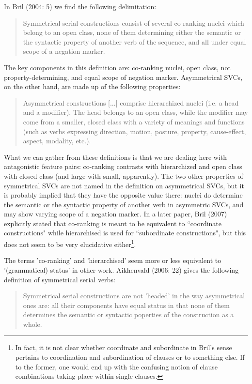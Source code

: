 In Bril (2004: 5) we find the following delimitation: \begin{quote}Symmetrical serial constructions consist of several co-ranking nuclei which belong to an open class, none of them determining either the semantic or the syntactic property of another verb of the sequence, and all under equal scope of a negation marker.\end{quote}

The key components in this definition are: co-ranking nuclei, open class, not property-determining, and equal scope of negation marker. Asymmetrical SVCs, on the other hand, are made up of the following properties: \begin{quote}Asymmetrical constructions [...] comprise hierarchized nuclei (i.e. a head and a modifier). The head belongs to an open class, while the modifier may come from a smaller, closed class with a variety of meanings and functions (such as verbs expressing direction, motion, posture, property, cause-effect, aspect, modality, etc.).\end{quote}

What we can gather from these definitions is that we are dealing here with antagonistic feature pairs: co-ranking contrasts with hierarchized and open class with closed class (and large with small, apparently). The two other properties of symmetrical SVCs are not named in the definition on asymmetrical SVCs, but it is probably implied that they have the opposite value there: nuclei do determine the semantic or the syntactic property of another verb in asymmetric SVCs, and may show varying scope of a negation marker. In a later paper, Bril (2007) explicitly stated that co-ranking is meant to be equivalent to ``coordinate constructions" while hierarchised is used for ``subordinate constructions", but this does not seem to be very elucidative either\footnote{In fact, it is not clear whether coordinate and subordinate in Bril's sense pertains to coordination and subordination of clauses or to something else. If to the former, one would end up with the confusing notion of clause combinations taking place within single clauses.}.

The terms 'co-ranking' and 'hierarchised' seem more or less equivalent to '(grammatical) status' in other work. Aikhenvald (2006: 22) gives the following definition of symmetrical serial verbs:

\begin{quote}Symmetrical serial constructions are not 'headed' in the way asymmetrical ones are: all their components have equal status in that none of them determines the semantic or syntactic poperties of the construction as a whole.\end{quote}

